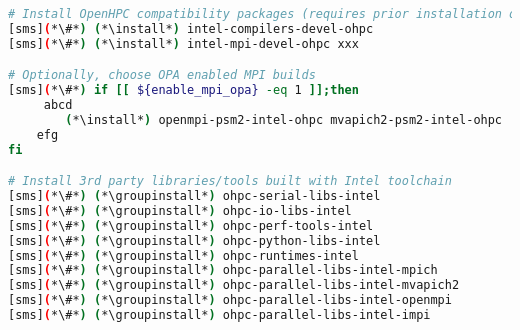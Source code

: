 \begin{lstlisting}[language=bash,keywords={},upquote=true,keepspaces]
# Install OpenHPC compatibility packages (requires prior installation of Parallel Studio)
[sms](*\#*) (*\install*) intel-compilers-devel-ohpc
[sms](*\#*) (*\install*) intel-mpi-devel-ohpc xxx

# Optionally, choose OPA enabled MPI builds
[sms](*\#*) if [[ ${enable_mpi_opa} -eq 1 ]];then
     abcd
        (*\install*) openmpi-psm2-intel-ohpc mvapich2-psm2-intel-ohpc
	efg
fi

# Install 3rd party libraries/tools built with Intel toolchain
[sms](*\#*) (*\groupinstall*) ohpc-serial-libs-intel
[sms](*\#*) (*\groupinstall*) ohpc-io-libs-intel
[sms](*\#*) (*\groupinstall*) ohpc-perf-tools-intel
[sms](*\#*) (*\groupinstall*) ohpc-python-libs-intel
[sms](*\#*) (*\groupinstall*) ohpc-runtimes-intel
[sms](*\#*) (*\groupinstall*) ohpc-parallel-libs-intel-mpich
[sms](*\#*) (*\groupinstall*) ohpc-parallel-libs-intel-mvapich2
[sms](*\#*) (*\groupinstall*) ohpc-parallel-libs-intel-openmpi
[sms](*\#*) (*\groupinstall*) ohpc-parallel-libs-intel-impi
\end{lstlisting}

